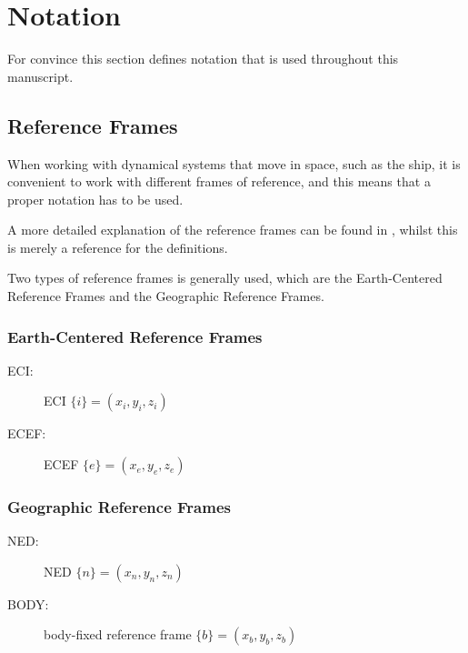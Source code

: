 \section{Notation}
For convince this section defines notation that is used throughout
this manuscript.

\subsection{Reference Frames}
When working with dynamical systems that move in space, such as the
ship, it is convenient to work with different frames of reference, and
this means that a proper notation has to be used.

A more detailed explanation of the reference frames can be found in
\citep{fossen}, whilst this is merely a reference for the definitions.

Two types of reference frames is generally used, which are the
Earth-Centered Reference Frames and the Geographic Reference Frames.

\subsubsection{Earth-Centered Reference Frames}
\begin{description}
	\item[ECI:] \acl{ECI} $\{i\} = (x_i, y_i, z_i)$
	\item[ECEF:] \acl{ECEF} $\{e\} = (x_e, y_e, z_e)$
\end{description}

\subsubsection{Geographic Reference Frames}
\begin{description}
	\item[NED:] \acl{NED} $\{n\} = (x_n, y_n, z_n)$
	\item[BODY:] body-fixed reference frame $\{b\} = (x_b, y_b, z_b)$
\end{description}


